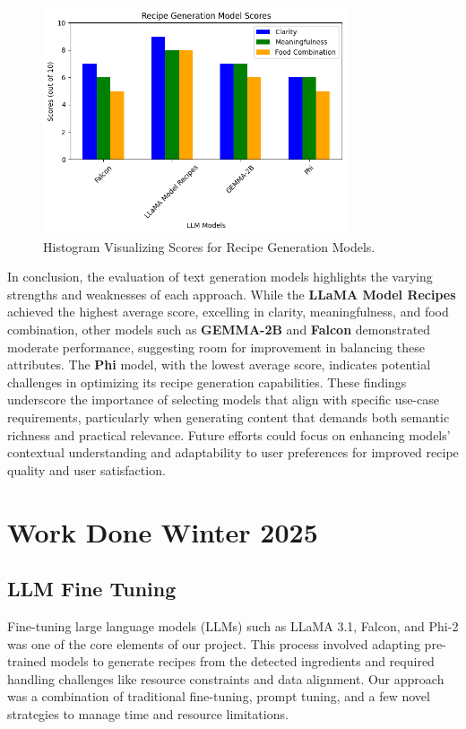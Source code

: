 \documentclass[letterpaper,11pt]{report}
\begin{document}
\begin{figure}[h!]
\centering
\includegraphics[width=0.8\textwidth]{rec.png} %
\caption{Histogram Visualizing Scores for Recipe Generation Models.}
\label{fig:recipe-generation-histogram}
\end{figure}


In conclusion, the evaluation of text generation models highlights the varying strengths and weaknesses of each approach. While the \textbf{LLaMA Model Recipes} achieved the highest average score, excelling in clarity, meaningfulness, and food combination, other models such as \textbf{GEMMA-2B} and \textbf{Falcon} demonstrated moderate performance, suggesting room for improvement in balancing these attributes. The \textbf{Phi} model, with the lowest average score, indicates potential challenges in optimizing its recipe generation capabilities. These findings underscore the importance of selecting models that align with specific use-case requirements, particularly when generating content that demands both semantic richness and practical relevance. Future efforts could focus on enhancing models' contextual understanding and adaptability to user preferences for improved recipe quality and user satisfaction.
\chapter{Work Done Winter 2025}\label{chapter:Winter 2025}

\section{LLM Fine Tuning}

Fine-tuning large language models (LLMs) such as LLaMA 3.1, Falcon, and Phi-2 was one of the core elements of our project. This process involved adapting pre-trained models to generate recipes from the detected ingredients and required handling challenges like resource constraints and data alignment. Our approach was a combination of traditional fine-tuning, prompt tuning, and a few novel strategies to manage time and resource limitations.
\end{document}
